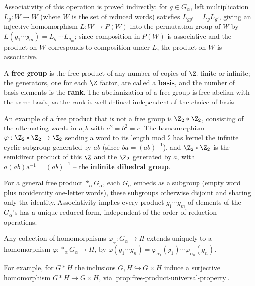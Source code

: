 Associativity of this operation is proved indirectly: for $g \in G_\alpha$, left
multiplication $L_g : W \to W$ (where $W$ is the set of reduced words) satisfies
$L_{gg'} = L_gL_{g'}$, giving an injective homomorphism $L : W \to P(W)$ into the
permutation group of $W$ by $L(g_1\cdots g_m) = L_{g_1}\cdots L_{g_m}$; since composition in
$P(W)$ is associative and the product on $W$ corresponds to composition under $L$,
the product on $W$ is associative.

\begin{definition}
\label{def:free-group-basis-rank}
A \textbf{free group} is the free product of any number of copies of $\Z$, finite or
infinite; the generators, one for each $\Z$ factor, are called a \textbf{basis}, and the
number of basis elements is the \textbf{rank}. The abelianization of a free group is free
abelian with the same basis, so the rank is well-defined independent of the choice
of basis.
\end{definition}

An example of a free product that is not a free group is $\Z_2 * \Z_2$, consisting of the
alternating words in $a,b$ with $a^2=b^2=e$. The homomorphism
$\varphi : \Z_2*\Z_2 \to \Z_2$ sending a word to its length mod 2 has kernel the infinite
cyclic subgroup generated by $ab$ (since $ba=(ab)^{-1}$), and $\Z_2*\Z_2$ is the semidirect
product of this $\Z$ and the $\Z_2$ generated by $a$, with $a(ab)a^{-1} = (ab)^{-1}$ -- the
\textbf{infinite dihedral group}.

For a general free product $*_\alpha G_\alpha$, each $G_\alpha$ embeds as a subgroup (empty word
plus nonidentity one-letter words), these subgroups otherwise disjoint and sharing
only the identity. Associativity implies every product $g_1\cdots g_m$ of elements of the
$G_\alpha$'s has a unique reduced form, independent of the order of reduction operations.

\begin{proposition}
\label{prop:free-product-universal-property}
Any collection of homomorphisms $\varphi_\alpha : G_\alpha \to H$ extends uniquely to a
homomorphism $\varphi : *_\alpha G_\alpha \to H$, by $\varphi(g_1\cdots g_n) = \varphi_{\alpha_1}(g_1)\cdots\varphi_{\alpha_n}(g_n)$.
\end{proposition}

For example, for $G*H$ the inclusions $G,H \hookrightarrow G\times H$ induce a surjective
homomorphism $G*H \to G\times H$, via \cref{prop:free-product-universal-property}.

